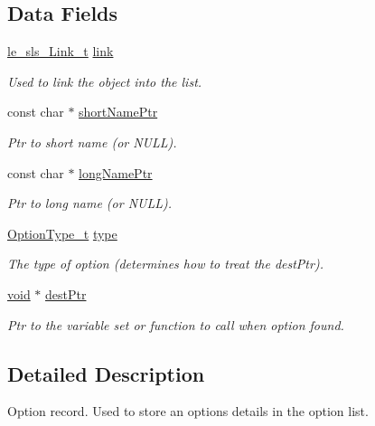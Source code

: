 \subsection*{Data Fields}
\begin{DoxyCompactItemize}
\item 
\hyperlink{structle__sls___link__t}{le\+\_\+sls\+\_\+\+Link\+\_\+t} \hyperlink{struct_option_rec__t_a52b1985a530cfe362377c308235db48e}{link}
\begin{DoxyCompactList}\small\item\em Used to link the object into the list. \end{DoxyCompactList}\item 
const char $\ast$ \hyperlink{struct_option_rec__t_a36848bfbc10e1b2efc7bb55298bffbfe}{short\+Name\+Ptr}
\begin{DoxyCompactList}\small\item\em Ptr to short name (or N\+U\+LL). \end{DoxyCompactList}\item 
const char $\ast$ \hyperlink{struct_option_rec__t_aa234031bd4d05347d5e6a92d631bda3a}{long\+Name\+Ptr}
\begin{DoxyCompactList}\small\item\em Ptr to long name (or N\+U\+LL). \end{DoxyCompactList}\item 
\hyperlink{args_8c_aef8c27eb3b153dd036c331e3314ab2d2}{Option\+Type\+\_\+t} \hyperlink{struct_option_rec__t_ac01c1f69b8fb0b62ed50d701049b5862}{type}
\begin{DoxyCompactList}\small\item\em The type of option (determines how to treat the dest\+Ptr). \end{DoxyCompactList}\item 
\hyperlink{_t_e_m_p_l_a_t_e__cdef_8h_ac9c84fa68bbad002983e35ce3663c686}{void} $\ast$ \hyperlink{struct_option_rec__t_a8ed0f7e1979b02ae1385dd403a627b46}{dest\+Ptr}
\begin{DoxyCompactList}\small\item\em Ptr to the variable set or function to call when option found. \end{DoxyCompactList}\end{DoxyCompactItemize}


\subsection{Detailed Description}
Option record. Used to store an option\textquotesingle{}s details in the option list. 

